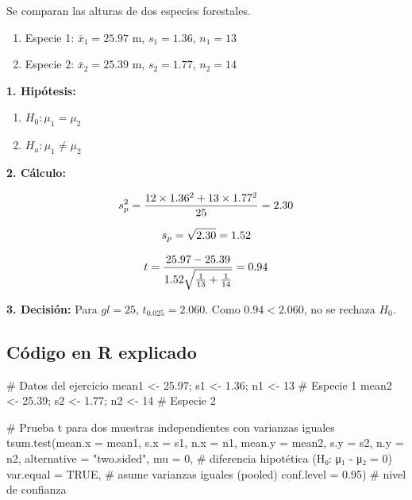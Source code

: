 \documentclass[
  spanish,
  letterpaper,
]{book}
\newenvironment{Shaded}{\begin{snugshade}}{\end{snugshade}}
\newcommand{\AttributeTok}[1]{\textcolor[rgb]{0.40,0.45,0.13}{#1}}
\newcommand{\CommentTok}[1]{\textcolor[rgb]{0.37,0.37,0.37}{#1}}
\newcommand{\ConstantTok}[1]{\textcolor[rgb]{0.56,0.35,0.01}{#1}}
\newcommand{\DecValTok}[1]{\textcolor[rgb]{0.68,0.00,0.00}{#1}}
\newcommand{\FloatTok}[1]{\textcolor[rgb]{0.68,0.00,0.00}{#1}}
\newcommand{\FunctionTok}[1]{\textcolor[rgb]{0.28,0.35,0.67}{#1}}
\newcommand{\NormalTok}[1]{\textcolor[rgb]{0.00,0.23,0.31}{#1}}
\newcommand{\OtherTok}[1]{\textcolor[rgb]{0.00,0.23,0.31}{#1}}
\newcommand{\StringTok}[1]{\textcolor[rgb]{0.13,0.47,0.30}{#1}}
\begin{document}
Se comparan las alturas de dos especies forestales.

\begin{enumerate}
\def\labelenumi{\arabic{enumi}.}
\item
  Especie 1: \(\bar{x}_1 = 25.97\) m, \(s_1 = 1.36\), \(n_1 = 13\)
\item
  Especie 2: \(\bar{x}_2 = 25.39\) m, \(s_2 = 1.77\), \(n_2 = 14\)
\end{enumerate}

\textbf{1. Hipótesis:}

\begin{enumerate}
\def\labelenumi{\arabic{enumi}.}
\item
  \(H_0: \mu_1 = \mu_2\)
\item
  \(H_a: \mu_1 \neq \mu_2\)
\end{enumerate}

\textbf{2. Cálculo:}

\[\LARGE s_p^2 = \frac{12 \times 1.36^2 + 13 \times 1.77^2}{25} = 2.30  \]

\[\huge s_p = \sqrt{2.30} = 1.52  \]

\[\huge t = \frac{25.97 - 25.39}{1.52 \sqrt{\frac{1}{13} + \frac{1}{14}}} = 0.94\]

\textbf{3. Decisión:} Para \(gl=25\), \(t_{0.025} = 2.060\). Como
\(0.94 < 2.060\), no se rechaza \(H_0\).

\subsection{Código en R explicado}\label{cuxf3digo-en-r-explicado-1}

\begin{Shaded}
\begin{Highlighting}[]
\CommentTok{\# Datos del ejercicio}
\NormalTok{mean1 }\OtherTok{\textless{}{-}} \FloatTok{25.97}\NormalTok{; s1 }\OtherTok{\textless{}{-}} \FloatTok{1.36}\NormalTok{; n1 }\OtherTok{\textless{}{-}} \DecValTok{13}  \CommentTok{\# Especie 1}
\NormalTok{mean2 }\OtherTok{\textless{}{-}} \FloatTok{25.39}\NormalTok{; s2 }\OtherTok{\textless{}{-}} \FloatTok{1.77}\NormalTok{; n2 }\OtherTok{\textless{}{-}} \DecValTok{14}  \CommentTok{\# Especie 2}

\CommentTok{\# Prueba t para dos muestras independientes con varianzas iguales}
\FunctionTok{tsum.test}\NormalTok{(}\AttributeTok{mean.x =}\NormalTok{ mean1, }\AttributeTok{s.x =}\NormalTok{ s1, }\AttributeTok{n.x =}\NormalTok{ n1,}
          \AttributeTok{mean.y =}\NormalTok{ mean2, }\AttributeTok{s.y =}\NormalTok{ s2, }\AttributeTok{n.y =}\NormalTok{ n2,}
          \AttributeTok{alternative =} \StringTok{"two.sided"}\NormalTok{,}
          \AttributeTok{mu =} \DecValTok{0}\NormalTok{,                    }\CommentTok{\# diferencia hipotética (H₀: μ₁ {-} μ₂ = 0)}
          \AttributeTok{var.equal =} \ConstantTok{TRUE}\NormalTok{,          }\CommentTok{\# asume varianzas iguales (pooled)}
          \AttributeTok{conf.level =} \FloatTok{0.95}\NormalTok{)         }\CommentTok{\# nivel de confianza}
\end{Highlighting}
\end{Shaded}
\end{document}
